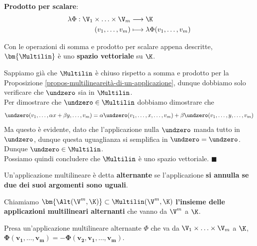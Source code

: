 \documentclass[11pt, a4paper, titlepage, oneside]{scrbook}
\begin{document}
    {\Large\textbf{Prodotto per scalare}:}
    \begin{align*}
        \lambda \Phi: \V_1 \times \ldots \times \V_m &\longrightarrow \K \\
        (v_1,\ldots,v_m) &\longmapsto \lambda \Phi(v_1, \ldots, v_m)
    \end{align*}

\bigskip

\begin{Proposizione}[]
\label{propos-multilin-spazio-vett}
Con le operazioni di somma e prodotto per scalare appena descritte, $\bm{\Multilin}$ è uno \textbf{spazio vettoriale} su $\K$.
\end{Proposizione}
 
\Dimostrazione \nopagebreak

Sappiamo già che $\Multilin$ è chiuso rispetto a somma e prodotto per la Proposizione \ref{propos-multilineareità-di-un-applicazione}, dunque dobbiamo solo verificare che $\undzero$ sia in $\Multilin$. \\
Per dimostrare che $\undzero \in \Multilin$ dobbiamo dimostrare che 
\[
\undzero(v_1, \ldots, \alpha x + \beta y, \ldots, v_m) = \alpha \undzero (v_1, \ldots, x, \ldots, v_m) + \beta \undzero(v_1, \ldots, y, \ldots, v_m)
\]
Ma questo è evidente, dato che l'applicazione nulla $\undzero$ manda tutto in $\undzero$, dunque questa uguaglianza si semplifica in $\undzero = \undzero$. Dunque $\undzero \in \Multilin$. \\
Possiamo quindi concludere che $\Multilin$ è uno spazio vettoriale. $\blacksquare$

\begin{Definizione}
\label{def-app-multilin-altern}
Un'applicazione multilineare è detta \textbf{alternante} se l'applicazione \textbf{si annulla se due dei suoi argomenti sono uguali}.
\end{Definizione}

\begin{Definizione}
\label{def-insieme-app-multilin-altern}
Chiamiamo $\bm{\Alt(\V^m, \K)} \subset \Multilin(\V^m, \K)$ \textbf{l'insieme delle applicazioni multilineari alternanti} che vanno da $\V^m$ a $\K$.
\end{Definizione}

\begin{Osservazione}[]
\label{oss-inversa-app-multil-alt}
Presa un'applicazione multilineare alternante $\Phi$ che va da $\V_1 \times \ldots \times \V_m$ a $\K$, \mbox{$\bm{\Phi(v_1, \ldots, v_m) = -\Phi(v_2, v_1, \ldots, v_m)}$}.
\end{Osservazione}
\end{document}

